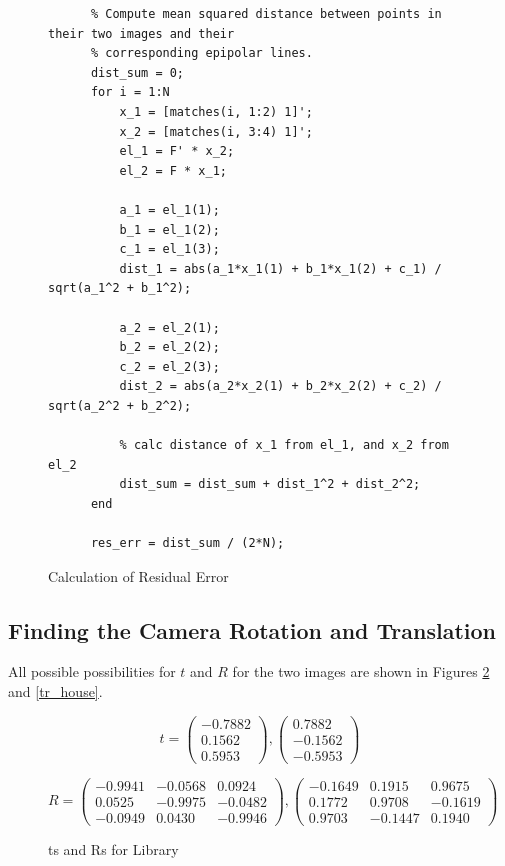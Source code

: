 \documentclass[11pt]{article}
\begin{document}
\begin{figure}[h!]
  \caption{Calculation of Residual Error}
  \label{residual_code}
  \centering
    \begin{lstlisting}
      % Compute mean squared distance between points in their two images and their
      % corresponding epipolar lines.
      dist_sum = 0;
      for i = 1:N
          x_1 = [matches(i, 1:2) 1]';
          x_2 = [matches(i, 3:4) 1]';
          el_1 = F' * x_2;
          el_2 = F * x_1;
          
          a_1 = el_1(1);
          b_1 = el_1(2);
          c_1 = el_1(3);
          dist_1 = abs(a_1*x_1(1) + b_1*x_1(2) + c_1) / sqrt(a_1^2 + b_1^2);

          a_2 = el_2(1);
          b_2 = el_2(2);
          c_2 = el_2(3);
          dist_2 = abs(a_2*x_2(1) + b_2*x_2(2) + c_2) / sqrt(a_2^2 + b_2^2);

          % calc distance of x_1 from el_1, and x_2 from el_2
          dist_sum = dist_sum + dist_1^2 + dist_2^2;
      end

      res_err = dist_sum / (2*N);
    \end{lstlisting}
\end{figure}

\newpage
\subsection{Finding the Camera Rotation and Translation}
All possible possibilities for $t$ and $R$ for the two images are shown in
Figures \ref{tr_library} and \ref{tr_house}.

\begin{figure}[h!]
  \caption{ts and Rs for Library}
  \label{tr_library}
  \centering
    \[t = \begin{pmatrix}
      -0.7882\\
      0.1562\\
      0.5953
    \end{pmatrix}, 
    \begin{pmatrix}
      0.7882\\
      -0.1562\\
      -0.5953
    \end{pmatrix}\]

    \[R = \begin{pmatrix}
      -0.9941&-0.0568&0.0924\\
       0.0525&-0.9975&-0.0482\\
      -0.0949& 0.0430&-0.9946
    \end{pmatrix},
    \begin{pmatrix}
      -0.1649&0.1915&0.9675\\
      0.1772& 0.9708&-0.1619\\
      0.9703&-0.1447&0.1940
    \end{pmatrix}\]
\end{figure}
\end{document}

